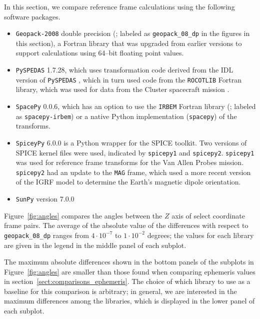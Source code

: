 \documentclass[draft]{agujournal2019}
\begin{document}
In this section, we compare reference frame calculations using the following software packages. 

\begin{itemize}
    \item \texttt{Geopack-2008} double precision (; labeled as \texttt{geopack\_08\_dp} in the figures in this section), a Fortran library that was upgraded from earlier versions to support calculations using 64--bit floating point values.
    \item \texttt{PySPEDAS} 1.7.28, which uses transformation code derived from the IDL version of \texttt{PySPEDAS} \cite{Angelopoulos2024IDL}, which in turn used code from the \texttt{ROCOTLIB} Fortran \cite{ROCOTLIB} library, which was used for data from the Cluster spacecraft mission \cite{ClusterTools1993}.
    \item \texttt{SpacePy} 0.0.6, which has an option to use the \texttt{IRBEM} Fortran library (; labeled as \texttt{spacepy-irbem}) or a native Python implementation (\texttt{spacepy}) of the transforms.
    \item \texttt{SpiceyPy} 6.0.0 is a Python wrapper for the SPICE toolkit. Two versions of SPICE kernel files were used, indicated by \texttt{spicepy1} and \texttt{spicepy2}. \texttt{spicepy1} was used for reference frame transforms for the Van Allen Probes mission. \texttt{spicepy2} had an update to the \texttt{MAG} frame, which used a more recent version of the IGRF model \cite{Alken2021} to determine the Earth's magnetic dipole orientation.
    \item \texttt{SunPy} version 7.0.0
\end{itemize}

Figure~\ref{fig:angles} compares the angles between the $Z$ axis of select coordinate frame pairs. The average of the absolute value of the differences with respect to \texttt{geopack\_08\_dp} ranges from $4\cdot 10^{-7}$ to $1\cdot 10^{-2}$ degrees; the values for each library are given in the legend in the middle panel of each subplot. %

The maximum absolute differences shown in the bottom panels of the subplots in Figure~\ref{fig:angles} are smaller than those found when comparing ephemeris values in section~\ref{sect:comparisons_ephemeris}. The choice of which library to use as a baseline for this comparison is arbitrary; in general, we are interested in the maximum differences among the libraries, which is displayed in the lower panel of each subplot.
\end{document}
